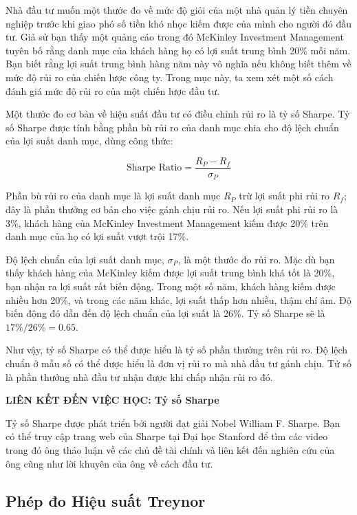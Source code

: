 Nhà đầu tư muốn một thước đo về mức độ giỏi của một nhà quản lý tiền chuyên nghiệp trước khi giao phó số tiền khó nhọc kiếm được của mình cho người đó đầu tư. Giả sử bạn thấy một quảng cáo trong đó McKinley Investment Management tuyên bố rằng danh mục của khách hàng họ có lợi suất trung bình 20\% mỗi năm. Bạn biết rằng lợi suất trung bình hàng năm này vô nghĩa nếu không biết thêm về mức độ rủi ro của chiến lược công ty. Trong mục này, ta xem xét một số cách đánh giá mức độ rủi ro của một chiến lược đầu tư.

Một thước đo cơ bản về hiệu suất đầu tư có điều chỉnh rủi ro là tỷ số Sharpe. Tỷ số Sharpe được tính bằng phần bù rủi ro của danh mục chia cho độ lệch chuẩn của lợi suất danh mục, dùng công thức:

$$
\text{Sharpe Ratio} = \frac{R_P - R_f}{\sigma_P}
$$

Phần bù rủi ro của danh mục là lợi suất danh mục $R_P$ trừ lợi suất phi rủi ro $R_f$; đây là phần thưởng cơ bản cho việc gánh chịu rủi ro. Nếu lợi suất phi rủi ro là 3\%, khách hàng của McKinley Investment Management kiếm được 20\% trên danh mục của họ có lợi suất vượt trội 17\%.

Độ lệch chuẩn của lợi suất danh mục, $\sigma_P$, là một thước đo rủi ro. Mặc dù bạn thấy khách hàng của McKinley kiếm được lợi suất trung bình khá tốt là 20\%, bạn nhận ra lợi suất rất biến động. Trong một số năm, khách hàng kiếm được nhiều hơn 20\%, và trong các năm khác, lợi suất thấp hơn nhiều, thậm chí âm. Độ biến động đó dẫn đến độ lệch chuẩn của lợi suất là 26\%. Tỷ số Sharpe sẽ là $17\%/26\% = 0.65$.

Như vậy, tỷ số Sharpe có thể được hiểu là tỷ số phần thưởng trên rủi ro. Độ lệch chuẩn ở mẫu số có thể được hiểu là đơn vị rủi ro mà nhà đầu tư gánh chịu. Tử số là phần thưởng nhà đầu tư nhận được khi chấp nhận rủi ro đó.

\begin{framed}
\textbf{LIÊN KẾT ĐẾN VIỆC HỌC: Tỷ số Sharpe}

Tỷ số Sharpe được phát triển bởi người đạt giải Nobel William F. Sharpe. Bạn có thể truy cập trang web của Sharpe tại Đại học Stanford để tìm các video trong đó ông thảo luận về các chủ đề tài chính và liên kết đến nghiên cứu của ông cũng như lời khuyên của ông về cách đầu tư.
\end{framed}

\subsection*{Phép đo Hiệu suất Treynor}

